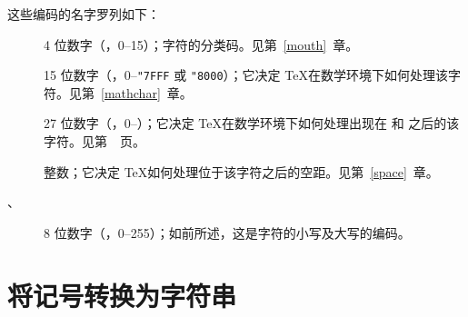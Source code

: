 \documentclass{book}
\begin{document}
这些编码的名字罗列如下：
\begin{description}
\item [] 4 位数字（，0--15）；字符的分类码。见第~\ref{mouth}~章。
\item [] 15 位数字（，0--\verb-"7FFF- 或 \verb-"8000-）；它决定 \TeX 在数学环境下如何处理该字符。见第~\ref{mathchar}~章。
\item [] 27 位数字（，0--）；它决定 \TeX 在数学环境下如何处理出现在  和  之后的该字符。见第~\pageref{delcodes}~页。
\item [] 整数；它决定 \TeX 如何处理位于该字符之后的空距。见第~\ref{space}~章。
\item [、] 8 位数字（，0--255）；如前所述，这是字符的小写及大写的编码。
\end{description}

\section{将记号转换为字符串}
\end{document}

